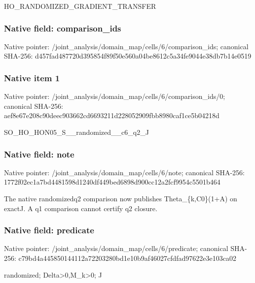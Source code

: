 \documentclass[10pt,a4paper]{article}
\begin{document}
\begingroup\raggedright\sloppy HO\_\allowbreak{}RANDOMIZED\_\allowbreak{}GRADIENT\_\allowbreak{}TRANSFER\par\endgroup

\subsubsection{Native field: comparison\_\allowbreak{}ids}
Native pointer: /joint\_\allowbreak{}analysis/domain\_\allowbreak{}map/cells/6/comparison\_\allowbreak{}ids; canonical SHA-256: d457fad487720d395854f89f50e560a04be8612c5a34fe9044e38db7b14e0519

\subsubsection{Native item 1}
Native pointer: /joint\_\allowbreak{}analysis/domain\_\allowbreak{}map/cells/6/comparison\_\allowbreak{}ids/0; canonical SHA-256: aef8e67e208c90deec903662cd6693211d228052909fbb8980caf1ce5b04218d

\begingroup\raggedright\sloppy SO\_\allowbreak{}HO\_\allowbreak{}HON05\_\allowbreak{}S\_\allowbreak{}\_\allowbreak{}randomized\_\allowbreak{}\_\allowbreak{}c6\_\allowbreak{}q2\_\allowbreak{}J\par\endgroup

\subsubsection{Native field: note}
Native pointer: /joint\_\allowbreak{}analysis/domain\_\allowbreak{}map/cells/6/note; canonical SHA-256: 1772f02ec1a7bd4481598d1240df449bed6898d900cc12a2fcf9954c5501b464

\begingroup\raggedright\sloppy The native randomizedq2 comparison now publishes Theta\_\allowbreak{}\{k,\allowbreak{}C0\}(1+A) on exactJ. A q1 comparison cannot certify q2 closure.\par\endgroup

\subsubsection{Native field: predicate}
Native pointer: /joint\_\allowbreak{}analysis/domain\_\allowbreak{}map/cells/6/predicate; canonical SHA-256: c79bd4a445850144112a72203280bd1e10b9af46027cfdfad97622e3e103ca02

\begingroup\raggedright\sloppy randomized;\allowbreak{} Delta>0,\allowbreak{}M\_\allowbreak{}k>0;\allowbreak{} J\par\endgroup
\end{document}
